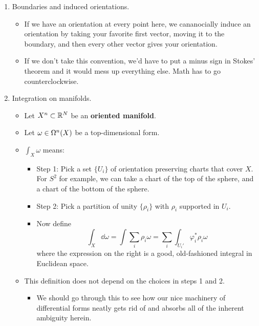 \documentclass[../notes.tex]{subfiles}
\begin{document}
\begin{itemize}
\begin{enumerate}
\begin{itemize}
        \end{itemize}
        \item Boundaries and induced orientations.
        \begin{itemize}
            \item If we have an orientation at every point here, we cananocially induce an orientation by taking your favorite first vector, moving it to the boundary, and then every other vector gives your orientation.
            \item If we don't take this convention, we'd have to put a minus sign in Stokes' theorem and it would mess up everything else. Math has to go counterclockwise.
        \end{itemize}
        \item Integration on manifolds.
        \begin{itemize}
            \item Let $X^n\subset\R^N$ be an \textbf{oriented manifold}.
            \item Let $\omega\in\ome[n]{X}$ be a top-dimensional form.
            \item $\int_X\omega$ means:
            \begin{itemize}
                \item Step 1: Pick a set $\{U_i\}$ of orientation preserving charts that cover $X$. For $S^2$ for example, we can take a chart of the top of the sphere, and a chart of the bottom of the sphere.
                \item Step 2: Pick a partition of unity $\{\rho_i\}$ with $\rho_i$ supported in $U_i$.
                \item Now define
                \begin{equation*}
                    \int_X\dd{\omega} = \int\sum_i\rho_i\omega
                    = \sum_i\int_{U_i'}\varphi_i^*\rho_i\omega
                \end{equation*}
                where the expression on the right is a good, old-fashioned integral in Euclidean space.
            \end{itemize}
            \item This definition does not depend on the choices in steps 1 and 2.
            \begin{itemize}
                \item We should go through this to see how our nice machinery of differential forms neatly gets rid of and absorbs all of the inherent ambiguity herein.
            \end{itemize}

\end{itemize}
\end{enumerate}
\end{itemize}
\end{document}
